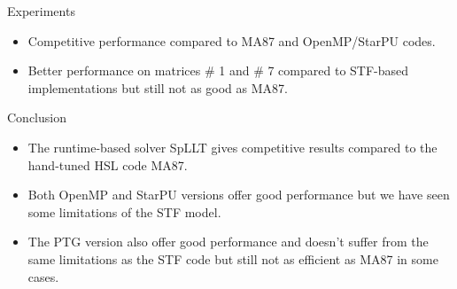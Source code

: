 \documentclass{beamer}
\newcommand{\db}[1]{\textcolor{mblue}{#1\xspace}}
\newcommand{\dd}[1]{\textcolor{gray!70}{#1\xspace}}
\begin{document}
\begin{frame}{Experiments}
\begin{center}
  \end{center}
  \begin{itemize}
  \item Competitive performance compared to MA87 and OpenMP/StarPU
    codes.
  \item Better performance on matrices \# 1 and \# 7 compared to
    STF-based implementations but still not as good as MA87.
  \end{itemize}
\end{frame}

\begin{frame}{Conclusion}
  \begin{itemize}
  \item The \alert{runtime-based} solver \db{SpLLT} gives competitive
    results compared to the \db{hand-tuned HSL code MA87}.

    \vspace{0.4cm}

  \item Both \alert{OpenMP} and \alert{StarPU} versions offer good
    performance but we have seen some limitations of the \db{STF
      model}.

    \vspace{0.4cm}

  \item The \alert{PTG} version also offer good performance and
    doesn't suffer from the same limitations as the \alert{STF} code
    but still not as efficient as MA87 in some cases.
  \end{itemize}
\end{frame}
\end{document}
